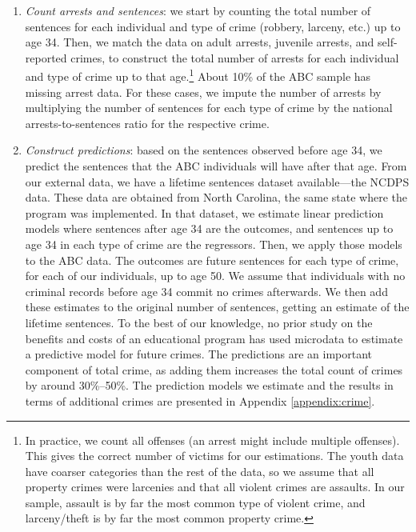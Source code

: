 \begin{enumerate}
\item \textit{Count arrests and sentences}: we start by counting the total number of sentences for each individual
and type of crime (robbery, larceny, etc.) up to age 34. Then, we match the data on adult arrests, juvenile arrests, and self-reported crimes, to construct the total number of  arrests for each individual and type of crime up to that age.\footnote{In practice, we count all offenses (an arrest might include multiple offenses). This gives the correct number of victims for our estimations. The youth data have coarser categories than the rest of the data, so we assume that all property crimes were larcenies and that all violent crimes are assaults. In our sample, assault is by far the most common type of violent crime, and larceny/theft is by far the most common property crime.} About 10\% of the ABC sample has missing arrest data. For these cases, we impute the number of arrests by multiplying the number of sentences for each type of crime by the  national arrests-to-sentences ratio for the respective crime.

\item \textit{Construct predictions}: based on the sentences observed before age 34, we predict the sentences
that the ABC individuals will have after that age. From our external data, we have a lifetime sentences dataset available---the
NCDPS data. These data are obtained from North Carolina, the same state where the program was implemented. In that dataset, we estimate linear prediction models where sentences after age 34 are the outcomes, and sentences up to age 34 in each type of crime are the regressors. Then, we apply those models to the ABC data. The outcomes are future sentences for each type of crime, for each of our individuals, up to age 50. We assume that individuals with no criminal records before age 34 commit no crimes afterwards. We then add these estimates to the original number of sentences, getting an estimate of the lifetime sentences. To the best of our knowledge, no prior study on the benefits and costs of an educational program has used microdata to estimate a predictive model for future crimes. The predictions are an important component of total crime, as adding them increases the total count of crimes by around 30\%--50\%. The prediction models we estimate and the results in terms of additional crimes are presented in Appendix \ref{appendix:crime}.


\end{enumerate}
